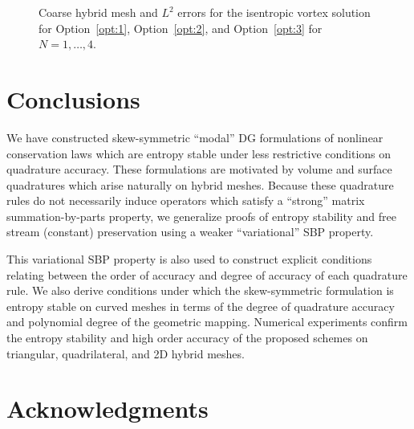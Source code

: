 \documentclass{svjour3}                     %
\begin{document}
\begin{figure}
{
}
\caption{Coarse hybrid mesh and  $L^2$ errors for the isentropic vortex solution for Option~\ref{opt:1}, Option~\ref{opt:2}, and Option~\ref{opt:3} for $N = 1,\ldots, 4$.}
\label{fig:hybriderrors}
\end{figure}

\section{Conclusions}

We have constructed skew-symmetric ``modal'' DG formulations of nonlinear conservation laws which are entropy stable under less restrictive conditions on quadrature accuracy.  These formulations are motivated by volume and surface quadratures which arise naturally on hybrid meshes.  Because these quadrature rules do not necessarily induce operators which satisfy a ``strong'' matrix summation-by-parts property, we generalize proofs of entropy stability and free stream (constant) preservation using a weaker ``variational'' SBP property.  

This variational SBP property is also used to construct explicit conditions relating between the order of accuracy and degree of accuracy of each quadrature rule.  We also derive conditions under which the skew-symmetric formulation is entropy stable on curved meshes in terms of the degree of quadrature accuracy and polynomial degree of the geometric mapping.  Numerical experiments confirm the entropy stability and high order accuracy of the proposed schemes on triangular, quadrilateral, and 2D hybrid meshes.  

\section{Acknowledgments} 
\end{document}

